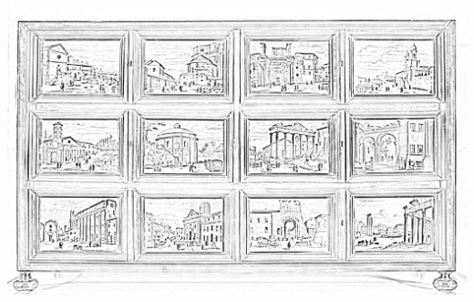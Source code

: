 \documentclass[hidelinks,12pt,a4paper]{article}
\begin{document}
\begin{adjustwidth}{-30mm}{-30mm}
			\thispagestyle{empty}
			\begin{minipage}{0.95\linewidth}
				\centering
				\includegraphics[scale=0.9]{Vedute_di_Roma_1.jpg}
			\end{minipage}
			
			\vspace*{\fill}
			\newpage
			

\end{adjustwidth}
\end{document}
